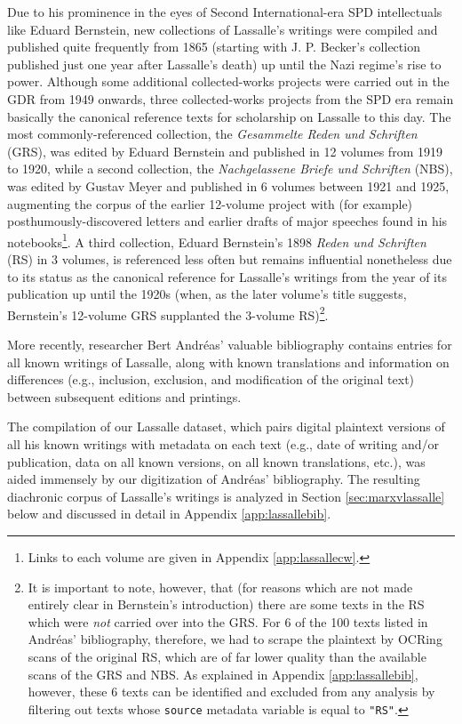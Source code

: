 Due to his prominence in the eyes of Second International-era SPD intellectuals like Eduard Bernstein, new collections of Lassalle's writings were compiled and published quite frequently from 1865 (starting with J. P. Becker's collection published just one year after Lassalle's death) up until the Nazi regime's rise to power. Although some additional collected-works projects were carried out in the GDR from 1949 onwards, three collected-works projects from the SPD era remain basically the canonical reference texts for scholarship on Lassalle to this day. The most commonly-referenced collection, the \textit{Gesammelte Reden und Schriften} (GRS), was edited by Eduard Bernstein and published in 12 volumes from 1919 to 1920, while a second collection, the \textit{Nachgelassene Briefe und Schriften} (NBS), was edited by Gustav Meyer and published in 6 volumes between 1921 and 1925, augmenting the corpus of the earlier 12-volume project with (for example) posthumously-discovered letters and earlier drafts of major speeches found in his notebooks\footnote{Links to each volume are given in Appendix \ref{app:lassallecw}.}. A third collection, Eduard Bernstein's 1898 \textit{Reden und Schriften} (RS) in 3 volumes, is referenced less often but remains influential nonetheless due to its status as the canonical reference for Lassalle's writings from the year of its publication up until the 1920s (when, as the later volume's title suggests, Bernstein's 12-volume GRS supplanted the 3-volume RS)\footnote{It is important to note, however, that (for reasons which are not made entirely clear in Bernstein's introduction) there are some texts in the RS which were \textit{not} carried over into the GRS. For 6 of the 100 texts listed in Andréas' bibliography, therefore, we had to scrape the plaintext by OCRing scans of the original RS, which are of far lower quality than the available scans of the GRS and NBS. As explained in Appendix \ref{app:lassallebib}, however, these 6 texts can be identified and excluded from any analysis by filtering out texts whose \texttt{source} metadata variable is equal to \texttt{"RS"}.}.

More recently, researcher Bert Andréas' valuable bibliography \citep{andreas_ferdinand_1981} contains entries for all known writings of Lassalle, along with known translations and information on differences (e.g., inclusion, exclusion, and modification of the original text) between subsequent editions and printings.

The compilation of our Lassalle dataset, which pairs digital plaintext versions of all his known writings with metadata on each text (e.g., date of writing and/or publication, data on all known versions, on all known translations, etc.), was aided immensely by our digitization of Andréas' bibliography. The resulting diachronic corpus of Lassalle's writings is analyzed in Section \ref{sec:marxvlassalle} below and discussed in detail in Appendix \ref{app:lassallebib}.


